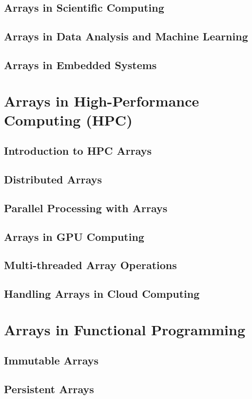 \documentclass[12pt, oneside]{book}
\begin{document}
	\section{Arrays in Scientific Computing}
	\section{Arrays in Data Analysis and Machine Learning}
	\section{Arrays in Embedded Systems}
	
	\chapter{Arrays in High-Performance Computing (HPC)}
	\section{Introduction to HPC Arrays}
	\section{Distributed Arrays}
	\section{Parallel Processing with Arrays}
	\section{Arrays in GPU Computing}
	\section{Multi-threaded Array Operations}
	\section{Handling Arrays in Cloud Computing}
	
	\chapter{Arrays in Functional Programming}
	\section{Immutable Arrays}
	\section{Persistent Arrays}
\end{document}
